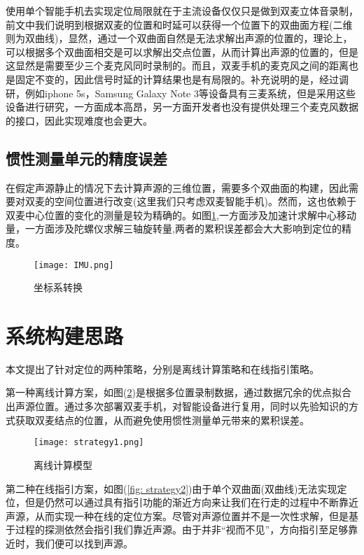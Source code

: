 \documentclass[winfonts,oneside]{njuthesis}
\begin{document}
			使用单个智能手机去实现定位局限就在于主流设备仅仅只是做到双麦立体音录制，前文中我们说明到根据双麦的位置和时延可以获得一个位置下的双曲面方程(二维则为双曲线)，显然，通过一个双曲面自然是无法求解出声源的位置的，理论上，可以根据多个双曲面相交是可以求解出交点位置，从而计算出声源的位置的，但是这显然是需要至少三个麦克风同时录制的。而且，双麦手机的麦克风之间的距离也是固定不变的，因此信号时延的计算结果也是有局限的。补充说明的是，经过调研，例如iphone 5s，Samsung Galaxy Note 3等设备具有三麦系统，但是采用这些设备进行研究，一方面成本高昂，另一方面开发者也没有提供处理三个麦克风数据的接口，因此实现难度也会更大。
			
		\subsection{惯性测量单元的精度误差}
		
			在假定声源静止的情况下去计算声源的三维位置，需要多个双曲面的构建，因此需要对双麦的空间位置进行改变(这里我们只考虑双麦智能手机)。然而，这也依赖于双麦中心位置的变化的测量是较为精确的。如图\ref{fig: IMU},一方面涉及加速计求解中心移动量，一方面涉及陀螺仪求解三轴旋转量,两者的累积误差都会大大影响到定位的精度。

			\begin{figure}[H]
				\centering
				\texttt{[image: IMU.png]} 
				\caption{坐标系转换}
				\label{fig: IMU}
			\end{figure}
		
	\section{系统构建思路}
	
		本文提出了针对定位的两种策略，分别是离线计算策略和在线指引策略。
		
		第一种离线计算方案，如图(\ref{fig: strategy1})是根据多位置录制数据，通过数据冗余的优点拟合出声源位置。通过多次部署双麦手机，对智能设备进行复用，同时以先验知识的方式获取双麦结点的位置，从而避免使用惯性测量单元带来的累积误差。
		
		\begin{figure}[H]
			\centering
			\texttt{[image: strategy1.png]} 
			\caption{离线计算模型}
			\label{fig: strategy1}
		\end{figure}
		
		第二种在线指引方案，如图(\ref{fig: strategy2})由于单个双曲面(双曲线)无法实现定位，但是仍然可以通过具有指引功能的渐近方向来让我们在行走的过程中不断靠近声源，从而实现一种在线的定位方案。尽管对声源位置并不是一次性求解，但是基于过程的探测依然会指引我们靠近声源。由于并非“视而不见”，方向指引至足够靠近时，我们便可以找到声源。
		
\end{document}
